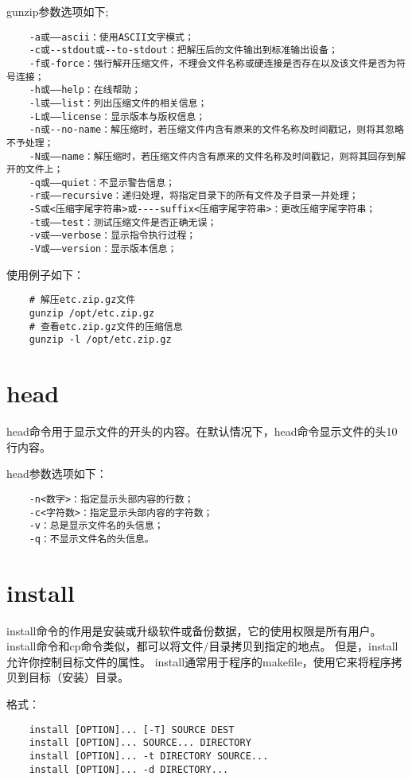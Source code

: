 \documentclass[a4paper,left=2.5cm,right=2.5cm,11pt]{article}
\begin{document}
	gunzip参数选项如下;
	\begin{lstlisting}
	-a或——ascii：使用ASCII文字模式； 
	-c或--stdout或--to-stdout：把解压后的文件输出到标准输出设备； 
	-f或-force：强行解开压缩文件，不理会文件名称或硬连接是否存在以及该文件是否为符号连接； 
	-h或——help：在线帮助； 
	-l或——list：列出压缩文件的相关信息； 
	-L或——license：显示版本与版权信息； 
	-n或--no-name：解压缩时，若压缩文件内含有原来的文件名称及时间戳记，则将其忽略不予处理； 
	-N或——name：解压缩时，若压缩文件内含有原来的文件名称及时间戳记，则将其回存到解开的文件上； 
	-q或——quiet：不显示警告信息； 
	-r或——recursive：递归处理，将指定目录下的所有文件及子目录一并处理； 
	-S或<压缩字尾字符串>或----suffix<压缩字尾字符串>：更改压缩字尾字符串； 
	-t或——test：测试压缩文件是否正确无误； 
	-v或——verbose：显示指令执行过程； 
	-V或——version：显示版本信息；
	\end{lstlisting}

	使用例子如下：
	\begin{lstlisting}
	# 解压etc.zip.gz文件
	gunzip /opt/etc.zip.gz
	# 查看etc.zip.gz文件的压缩信息
	gunzip -l /opt/etc.zip.gz
	\end{lstlisting}

\section{head}
	head命令用于显示文件的开头的内容。在默认情况下，head命令显示文件的头10行内容。\par

	head参数选项如下：
	\begin{lstlisting}
	-n<数字>：指定显示头部内容的行数； 
	-c<字符数>：指定显示头部内容的字符数； 
	-v：总是显示文件名的头信息； 
	-q：不显示文件名的头信息。
	\end{lstlisting}

\section{install}
	install命令的作用是安装或升级软件或备份数据，它的使用权限是所有用户。
	install命令和cp命令类似，都可以将文件/目录拷贝到指定的地点。
	但是，install允许你控制目标文件的属性。
	install通常用于程序的makefile，使用它来将程序拷贝到目标（安装）目录。\par

	格式：
	\begin{lstlisting}
	install [OPTION]... [-T] SOURCE DEST 
	install [OPTION]... SOURCE... DIRECTORY 
	install [OPTION]... -t DIRECTORY SOURCE... 
	install [OPTION]... -d DIRECTORY...
	\end{lstlisting}
\end{document}
